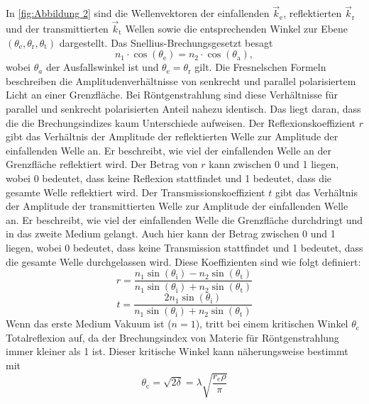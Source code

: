 In \autoref{fig:Abbildung 2} sind die Wellenvektoren der einfallenden $\vec{k}_\text{e}$, reflektierten $\vec{k}_\text{r}$ und der
transmittierten $\vec{k}_\text{t}$ Wellen sowie die entsprechenden Winkel zur Ebene $(\theta_\text{e},\theta_\text{r},\theta_\text{t})$ dargestellt.
Das Snellius-Brechungsgesetzt besagt
\begin{equation}
    n_1 \cdot \cos(\theta_\text{e})=n_2 \cdot \cos(\theta_\text{a}),
\end{equation}
wobei $\theta_a$ der Ausfallswinkel ist und $\theta_\text{e}=\theta_\text{r}$ gilt.    
Die Fresnelschen Formeln beschreiben die Amplitudenverhältnisse von senkrecht und parallel polarisiertem Licht
an einer Grenzfläche. Bei Röntgenstrahlung sind diese Verhältnisse für parallel und senkrecht polarisierten Anteil nahezu 
identisch. Das liegt daran, dass die die Brechungsindizes kaum Unterschiede aufweisen. 
Der Reflexionskoeffizient \(r\) gibt das Verhältnis der Amplitude der reflektierten Welle zur Amplitude der einfallenden Welle an. 
Er beschreibt, wie viel der einfallenden Welle an der Grenzfläche reflektiert wird. Der Betrag von \(r\) kann zwischen 0 und 1
liegen, wobei 0 bedeutet, dass keine Reflexion stattfindet und 1 bedeutet, dass die gesamte Welle reflektiert wird.
Der Transmissionskoeffizient \(t\) gibt das Verhältnis der Amplitude der transmittierten Welle zur Amplitude der einfallenden Welle an.
Er beschreibt, wie viel der einfallenden Welle die Grenzfläche durchdringt und in das zweite Medium gelangt. Auch hier kann der Betrag 
zwischen 0 und 1 liegen, wobei 0 bedeutet, dass keine Transmission stattfindet und 1 bedeutet, dass die gesamte Welle durchgelassen wird.
Diese Koeffizienten sind wie folgt definiert:
\begin{equation}
    r=\frac{n_1 \sin(\theta_\text{i})-n_2 \sin(\theta_\text{t})}{n_1 \sin(\theta_\text{i})+n_2 \sin(\theta_\text{t})}
    \label{eq:reflexion}
\end{equation}
\begin{equation}
    t=\frac{2n_1 \sin(\theta_\text{i})}{n_1 \sin(\theta_\text{i})+n_2 \sin(\theta_\text{t})} 
    \label{eq:transmission}
\end{equation}
Wenn das erste Medium Vakuum ist ($n=1$), tritt bei einem kritischen Winkel $\theta_\text{c}$ Totalreflexion auf, da der Brechungsindex von Materie für
Röntgenstrahlung immer kleiner als 1 ist. Dieser kritische Winkel kann näherungsweise bestimmt mit
\begin{equation}
    \theta_\text{c} = \sqrt{2\delta} = \lambda \sqrt{\frac{r_e \rho}{\pi}}
    \label{eq:kritischerwinkel}
\end{equation}    
